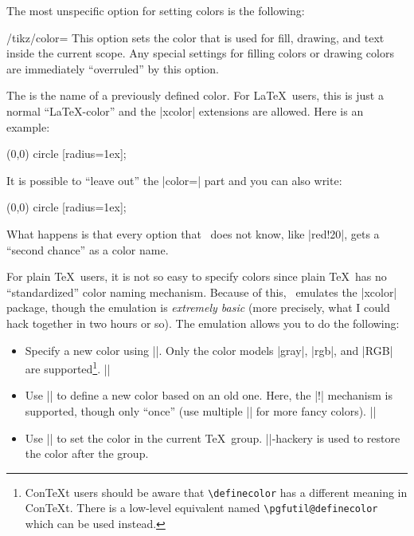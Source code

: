 The most unspecific option for setting colors is the following:
%
\begin{key}{/tikz/color=}
    This option sets the color that is used for fill, drawing, and text inside
    the current scope. Any special settings for filling colors or drawing
    colors are immediately ``overruled'' by this option.

    The  is the name of a previously defined color. For
    \LaTeX\ users, this is just a normal ``\LaTeX-color'' and the |xcolor|
    extensions are allowed. Here is an example:
\begin{codeexample}[]
\tikz \fill[color=red!20] (0,0) circle [radius=1ex];
\end{codeexample}

    It is possible to ``leave out'' the |color=| part and you can also write:
\begin{codeexample}[]
\tikz \fill[red!20] (0,0) circle [radius=1ex];
\end{codeexample}
    What happens is that every option that \tikzname\ does not know, like
    |red!20|, gets a ``second chance'' as a color name.

    For plain \TeX\ users, it is not so easy to specify colors since plain
    \TeX\ has no ``standardized'' color naming mechanism. Because of this,
    \pgfname\ emulates the |xcolor| package, though the emulation is
    \emph{extremely basic} (more precisely, what I could hack together in two
    hours or so). The emulation allows you to do the following:
    \begin{itemize}
        \item Specify a new color using |\definecolor|. Only the color models
            |gray|, |rgb|, and |RGB| are supported\footnote{Con\TeX t users
            should be aware that \texttt{\textbackslash definecolor} has a
            different meaning in Con\TeX t. There is a low-level equivalent
            named \texttt{\textbackslash pgfutil@definecolor} which can be
            used instead.}.
            \example ||
        \item Use || to define a new color based on an old one.
            Here, the |!| mechanism is supported, though only ``once'' (use
            multiple || for more fancy colors).
            \example ||
        \item Use |\color| to set the color in the current
            \TeX\ group. |\aftergroup|-hackery is used to restore the color
            after the group.
    \end{itemize}
\end{key}

